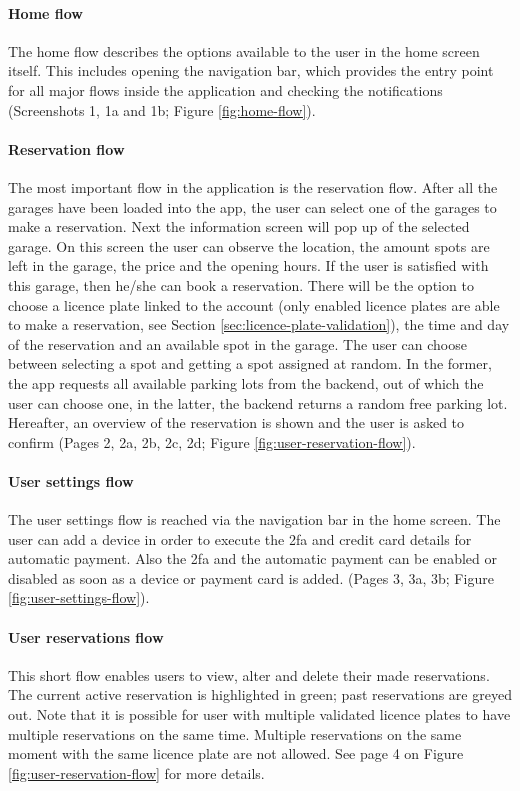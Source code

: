 \paragraph{Home flow}
The home flow describes the options available to the user in the home screen itself. This includes opening the navigation bar, which provides the entry point for all major flows inside the application and checking the notifications (Screenshots 1, 1a and 1b; Figure \ref{fig:home-flow}).

\paragraph{Reservation flow}
The most important flow in the application is the reservation flow. After all the garages have been loaded into the app, the user can select one of the garages to make a reservation. Next the information screen will pop up of the selected garage. On this screen the user can observe the location, the amount spots are left in the garage, the price and the opening hours. If the user is satisfied with this garage, then he/she can book a reservation. There will be the option to choose a licence plate linked to the account (only enabled licence plates are able to make a reservation, see Section \ref{sec:licence-plate-validation}), the time and day of the reservation and an available spot in the garage. The user can choose between selecting a spot and getting a spot assigned at random. In the former, the app requests all available parking lots from the backend, out of which the user can choose one, in the latter, the backend returns a random free parking lot. Hereafter, an overview of the reservation is shown and the user is asked to confirm (Pages 2, 2a, 2b, 2c, 2d; Figure \ref{fig:user-reservation-flow}).

\paragraph{User settings flow}
The user settings flow is reached via the navigation bar in the home screen. The user can add a device in order to execute the \ac{2fa} and credit card details for automatic payment. Also the \ac{2fa} and the automatic payment can be enabled or disabled as soon as a device or payment card is added. (Pages 3, 3a, 3b; Figure \ref{fig:user-settings-flow}).

\paragraph{User reservations flow}
This short flow enables users to view, alter and delete their made reservations. The current active reservation is highlighted in green; past reservations are greyed out. Note that it is possible for user with multiple validated licence plates to have multiple reservations on the same time. Multiple reservations on the same moment with the same licence plate are not allowed. See page 4 on Figure \ref{fig:user-reservation-flow} for more details.

